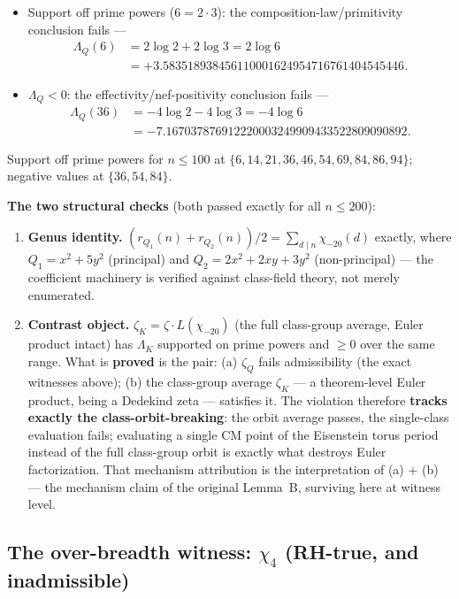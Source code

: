 \documentclass[11pt]{article}
\theoremstyle{plain}
\theoremstyle{definition}
\theoremstyle{remark}
\begin{document}
\begin{itemize}
\item Support off prime powers ($6 = 2 \cdot 3$): the
composition-law/primitivity conclusion fails ---
\begin{align*}
\Lambda_Q(6) &= 2 \log 2 + 2 \log 3 = 2 \log 6 \\
&= \mathbf{+3.583518938456110001624954716761404545446}.
\end{align*}
\item $\Lambda_Q < 0$: the effectivity/nef-positivity conclusion fails ---
\begin{align*}
\Lambda_Q(36) &= -4 \log 2 - 4 \log 3 = -4 \log 6 \\
&= \mathbf{-7.167037876912220003249909433522809090892}.
\end{align*}
\end{itemize}

Support off prime powers for $n \le 100$ at
$\{6, 14, 21, 36, 46, 54, 69, 84, 86, 94\}$; negative values at
$\{36, 54, 84\}$.

\medskip
\noindent\textbf{The two structural checks} (both passed exactly for all
$n \le 200$):

\begin{enumerate}
\item \textbf{Genus identity.}
$(r_{Q_1}(n) + r_{Q_2}(n))/2 = \sum_{d \mid n} \chi_{-20}(d)$ exactly, where
$Q_1 = x^2 + 5y^2$ (principal) and $Q_2 = 2x^2 + 2xy + 3y^2$ (non-principal)
--- the coefficient machinery is verified against class-field theory, not
merely enumerated.
\item \textbf{Contrast object.} $\zeta_K = \zeta \cdot L(\chi_{-20})$ (the
full class-group average, Euler product intact) has $\Lambda_K$ supported on
prime powers and $\ge 0$ over the same range. What is \textbf{proved} is the
pair: (a) $\zeta_Q$ fails admissibility (the exact witnesses above); (b) the
class-group average $\zeta_K$ --- a theorem-level Euler product, being a
Dedekind zeta --- satisfies it. The violation therefore \textbf{tracks exactly
the class-orbit-breaking}: the orbit average passes, the single-class
evaluation fails; evaluating a single CM point of the Eisenstein torus period
instead of the full class-group orbit is exactly what destroys Euler
factorization. That mechanism attribution is the interpretation of (a) $+$ (b)
--- the mechanism claim of the original Lemma~B, surviving here at witness
level.
\end{enumerate}

\subsection{The over-breadth witness: \texorpdfstring{$\chi_4$}{chi4}
(RH-true, and inadmissible)}\label{sec:chi4}
\end{document}
